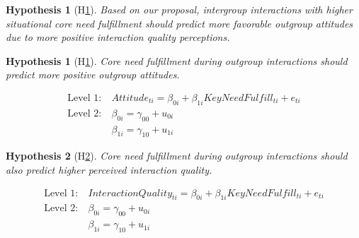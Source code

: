 \documentclass[man, 12pt, a4paper, mask]{apa7}
\theoremstyle{break}
\theoremstyle{plain}
\newtheorem{hyp}{Hypothesis}
\newtheorem{subhyp}{Hypothesis}
\begin{document}
\begin{mdframed}[style=mdfhypothesis]
    \begin{hyp}[H\ref{hyp:keyNeed}] \label{hyp:keyNeed}
    Based on our proposal, intergroup interactions with higher situational core need fulfillment should predict more favorable outgroup attitudes due to more positive interaction quality perceptions.
    \end{hyp}

    \setcounter{subhyp}{0}
    \begin{subhyp}[H\ref{hyp:keyNeedPred}] \label{hyp:keyNeedPred}
    \addtolength{\leftskip}{\subhypskip}
    Core need fulfillment during outgroup interactions should predict more positive outgroup attitudes.
    \end{subhyp}

    \begin{fleqn}[\eqskip]
      \begin{equation} \label{eq:SlopesAttCore}
        \begin{split}
            \textrm{Level 1:} &\ Attitude_{ti} = \beta_{0i} + \beta_{1i}KeyNeedFulfill_{ti} + e_{ti}\\
            \textrm{Level 2:} &\ \beta_{0i} = \gamma_{00} + u_{0i} \\
                              &\ \beta_{1i} = \gamma_{10} + u_{1i}
        \end{split}
      \end{equation}
    \end{fleqn}

    \begin{subhyp}[H\ref{hyp:keyNeedQual}] \label{hyp:keyNeedQual}
    \addtolength{\leftskip}{\subhypskip}
    Core need fulfillment during outgroup interactions should also predict higher perceived interaction quality.
    \end{subhyp}

    \begin{fleqn}[\eqskip]
      \begin{equation} \label{eq:SlopesQltCore}
        \begin{split}
            \textrm{Level 1:} &\ InteractionQuality_{ti} = \beta_{0i} + \beta_{1i}KeyNeedFulfill_{ti} + e_{ti}\\
            \textrm{Level 2:} &\ \beta_{0i} = \gamma_{00} + u_{0i} \\
                              &\ \beta_{1i} = \gamma_{10} + u_{1i}
        \end{split}
      \end{equation}
    \end{fleqn}


\end{mdframed}
\end{document}
